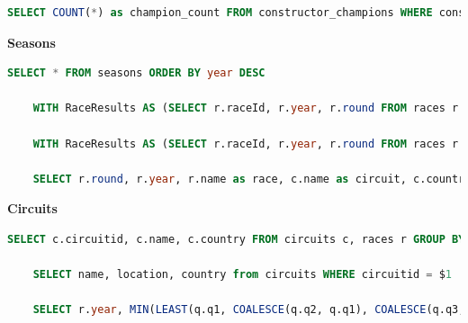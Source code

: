 \documentclass{article}
\begin{document}
\begin{enumerate}
\begin{lstlisting}[language=SQL]
    SELECT COUNT(*) as champion_count FROM constructor_champions WHERE constructorid = $1;
\end{lstlisting}\vspace{6mm}

\textbf{Seasons}\\

\begin{lstlisting}[language=SQL]
    SELECT * FROM seasons ORDER BY year DESC

    WITH RaceResults AS (SELECT r.raceId, r.year, r.round FROM races r JOIN seasons s ON r.year = s.year WHERE s.year = $1 ORDER BY r.year DESC, r.round DESC LIMIT 1) SELECT ds.driverid, ds.position, d.forename||' '||d.surname as name, ds.points as points FROM driver_standings ds, drivers d, RaceResults rr WHERE ds.raceId = rr.raceId and d.driverid = ds.driverid ORDER BY position ASC;

    WITH RaceResults AS (SELECT r.raceId, r.year, r.round FROM races r JOIN seasons s ON r.year = s.year WHERE s.year = $1 ORDER BY r.year DESC, r.round DESC LIMIT 1) SELECT cs.constructorid, cs.position, c.name as name, cs.points as points FROM constructor_standings cs, constructors c, RaceResults rr WHERE cs.raceId = rr.raceId and c.constructorid = cs.constructorid ORDER BY position ASC;

    SELECT r.round, r.year, r.name as race, c.name as circuit, c.country, r.raceid, c.circuitid FROM races as r, results re, circuits c WHERE r.raceid = re.raceid AND c.circuitid = r.circuitid AND r.year = $1 GROUP BY (race, c.name, c.country, r.year, r.round,r.raceid,c.circuitid) ORDER BY r.round ASC;
\end{lstlisting}\vspace{6mm}

\newpage
\textbf{Circuits}\\

\begin{lstlisting}[language=SQL]
    SELECT c.circuitid, c.name, c.country FROM circuits c, races r GROUP BY (c.circuitid, c.name,c.country) ORDER BY name ASC;

    SELECT name, location, country from circuits WHERE circuitid = $1

    SELECT r.year, MIN(LEAST(q.q1, COALESCE(q.q2, q.q1), COALESCE(q.q3, COALESCE(q.q2, q.q1)))) AS fastest_time FROM qualifying q JOIN races r ON q.raceId = r.raceId JOIN circuits c ON r.circuitId = c.circuitId WHERE c.circuitid = $1 AND q.position = 1 GROUP BY r.year ORDER BY r.year ASC;


\end{lstlisting}
\end{enumerate}
\end{document}
